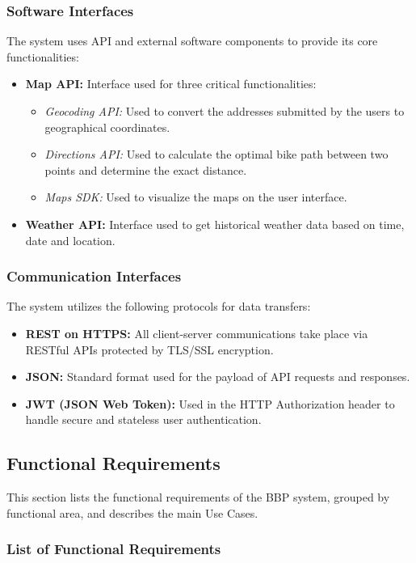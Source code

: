 \subsubsection{Software Interfaces}
The system uses API and external software components to provide its core functionalities:
\begin{itemize}
    \item[] \textbf{Map API:} Interface used for three critical functionalities:
    \begin{itemize}
        \item[] \textit{Geocoding API:} Used to convert the addresses submitted by the users to geographical coordinates.
        \item[] \textit{Directions API:} Used to calculate the optimal bike path between two points and determine the exact distance.
        \item[] \textit{Maps SDK:} Used to visualize the maps on the user interface.
    \end{itemize}
    \item[] \textbf{Weather API:} Interface used to get historical weather data based on time, date and location.
\end{itemize}

\subsubsection{Communication Interfaces}
The system utilizes the following protocols for data transfers:
\begin{itemize}
    \item[] \textbf{REST on HTTPS:} All client-server communications take place via RESTful APIs protected by TLS/SSL encryption.
    \item[] \textbf{JSON:} Standard format used for the payload of API requests and responses.
    \item[] \textbf{JWT (JSON Web Token):} Used in the HTTP Authorization header to handle secure and stateless user authentication.
\end{itemize}

\subsection{Functional Requirements}
This section lists the functional requirements of the BBP system, grouped by functional area, and describes the main Use Cases.

\subsubsection{List of Functional Requirements}


